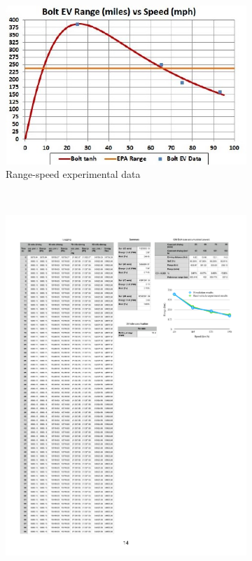 \documentclass[onecolumn]{IEEEconf}
\begin{document}
\begin{description}
\begin{figure} [h!]  %
 \renewcommand\thefigure{2}
\centering
	\begin{subfigure}{0.47\textwidth}
	\includegraphics[width=\hsize]{Figures/Bolt_EV_range.jpg}
	\caption{Range-speed experimental data}
	\label{fig:range_speed_exp}
	\end{subfigure}
~
	\begin{subfigure}{0.47\textwidth}
	\includegraphics[width=\hsize]{Figures/Range-speed_validation.pdf}

\end{subfigure}
\end{figure}
\end{description}
\end{document}
